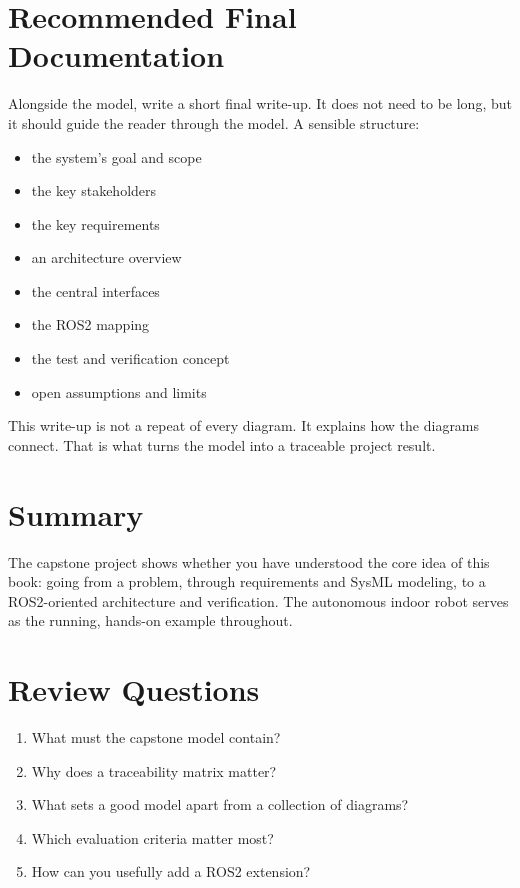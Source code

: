 \section{Recommended Final Documentation}
Alongside the model, write a short final write-up. It does not need to be long, but it should guide the reader through the model. A sensible structure:

\begin{itemize}
    \item the system's goal and scope
    \item the key stakeholders
    \item the key requirements
    \item an architecture overview
    \item the central interfaces
    \item the ROS2 mapping
    \item the test and verification concept
    \item open assumptions and limits
\end{itemize}

This write-up is not a repeat of every diagram. It explains how the diagrams connect. That is what turns the model into a traceable project result.

\section{Summary}
The capstone project shows whether you have understood the core idea of this book: going from a problem, through requirements and SysML modeling, to a ROS2-oriented architecture and verification. The autonomous indoor robot serves as the running, hands-on example throughout.

\section{Review Questions}
\begin{enumerate}
    \item What must the capstone model contain?
    \item Why does a traceability matrix matter?
    \item What sets a good model apart from a collection of diagrams?
    \item Which evaluation criteria matter most?
    \item How can you usefully add a ROS2 extension?
\end{enumerate}

